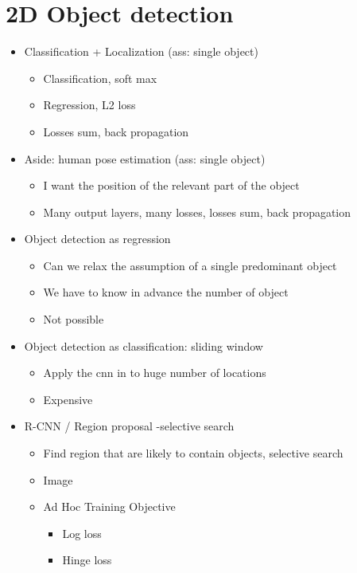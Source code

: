 \documentclass[12pt,oneside]{report}
\begin{document}
\section{2D Object detection}
\begin{itemize}
    \item Classification + Localization (ass: single object)
    \begin{itemize}
        \item Classification, soft max
        \item Regression, L2 loss
        \item Losses sum, back propagation
    \end{itemize}
    \item Aside: human pose estimation (ass: single object)
    \begin{itemize}
        \item I want the position of the relevant part of the object
        \item Many output layers, many losses, losses sum, back propagation
    \end{itemize}
    \item Object detection as regression
    \begin{itemize}
        \item Can we relax the assumption of a single predominant object
        \item We have to know in advance the number of object
        \item Not possible
    \end{itemize}
    \item Object detection as classification: sliding window
    \begin{itemize}
        \item Apply the cnn in to huge number of locations
        \item Expensive
    \end{itemize}
    \item R-CNN / Region proposal -selective search
    \begin{itemize}
        \item Find region that are likely to contain objects, selective search
        \item Image
        \item Ad Hoc Training Objective
        \begin{itemize}
            \item Log loss
            \item Hinge loss

\end{itemize}
\end{itemize}
\end{itemize}
\end{document}
